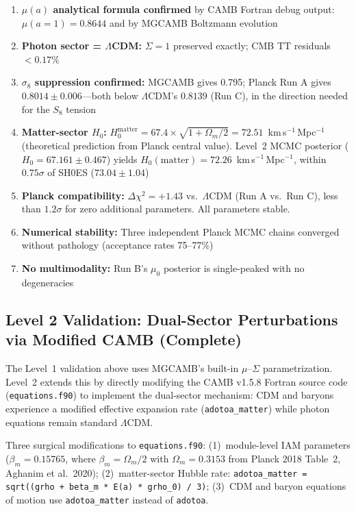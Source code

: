\documentclass[11pt,letterpaper]{article}
\begin{document}
\begin{enumerate}
\item \textbf{$\mu(a)$ analytical formula confirmed} by CAMB Fortran debug output: $\mu(a\!=\!1) = 0.8644$ and by MGCAMB Boltzmann evolution
\item \textbf{Photon sector = $\Lambda$CDM:} $\Sigma = 1$ preserved exactly; CMB TT residuals $< 0.17\%$
\item \textbf{$\sigma_8$ suppression confirmed:} MGCAMB gives 0.795; Planck Run A gives $0.8014 \pm 0.006$---both below $\Lambda$CDM's $0.8139$ (Run C), in the direction needed for the $S_8$ tension
\item \textbf{Matter-sector $H_0$:} $H_0^\mathrm{matter} = 67.4 \times \sqrt{1 + \Omega_m/2} = 72.51$~km\,s$^{-1}$\,Mpc$^{-1}$ (theoretical prediction from Planck central value). Level~2 MCMC posterior ($H_0 = 67.161 \pm 0.467$) yields $H_0(\mathrm{matter}) = 72.26$~km\,s$^{-1}$\,Mpc$^{-1}$, within $0.75\sigma$ of SH0ES ($73.04 \pm 1.04$)
\item \textbf{Planck compatibility:} $\Delta\chi^2 = +1.43$ vs.\ $\Lambda$CDM (Run A vs.\ Run C), less than $1.2\sigma$ for zero additional parameters. All parameters stable.
\item \textbf{Numerical stability:} Three independent Planck MCMC chains converged without pathology (acceptance rates 75--77\%)
\item \textbf{No multimodality:} Run B's $\mu_0$ posterior is single-peaked with no degeneracies
\end{enumerate}

\subsection{Level 2 Validation: Dual-Sector Perturbations via Modified CAMB (Complete)}

The Level~1 validation above uses MGCAMB's built-in $\mu$--$\Sigma$ parametrization. Level~2 extends this by directly modifying the CAMB v1.5.8 Fortran source code (\texttt{equations.f90}) to implement the dual-sector mechanism: CDM and baryons experience a modified effective expansion rate (\texttt{adotoa\_matter}) while photon equations remain standard $\Lambda$CDM.

Three surgical modifications to \texttt{equations.f90}: (1)~module-level IAM parameters ($\beta_m = 0.15765$, where $\beta_m = \Omega_m/2$ with $\Omega_m = 0.3153$ from Planck 2018 Table~2, Aghanim et al.\ 2020); (2)~matter-sector Hubble rate: \texttt{adotoa\_matter = sqrt((grho + beta\_m * E(a) * grho\_0) / 3)}; (3)~CDM and baryon equations of motion use \texttt{adotoa\_matter} instead of \texttt{adotoa}.
\end{document}
